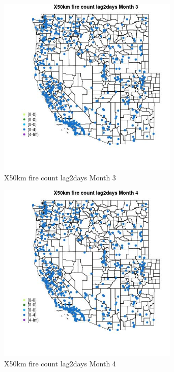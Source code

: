 \begin{figure} 
\centering  
\includegraphics[width=0.77\textwidth]{Code_Outputs/Report_ML_input_PM25_Step4_part_e_de_duplicated_aves_compiled_2019-05-14wNAs_MapObsMo3X50km_fire_count_lag2days.jpg} 
\caption{\label{fig:Report_ML_input_PM25_Step4_part_e_de_duplicated_aves_compiled_2019-05-14wNAsMapObsMo3X50km_fire_count_lag2days}X50km fire count lag2days Month 3} 
\end{figure} 
 

\begin{figure} 
\centering  
\includegraphics[width=0.77\textwidth]{Code_Outputs/Report_ML_input_PM25_Step4_part_e_de_duplicated_aves_compiled_2019-05-14wNAs_MapObsMo4X50km_fire_count_lag2days.jpg} 
\caption{\label{fig:Report_ML_input_PM25_Step4_part_e_de_duplicated_aves_compiled_2019-05-14wNAsMapObsMo4X50km_fire_count_lag2days}X50km fire count lag2days Month 4} 
\end{figure} 
 

